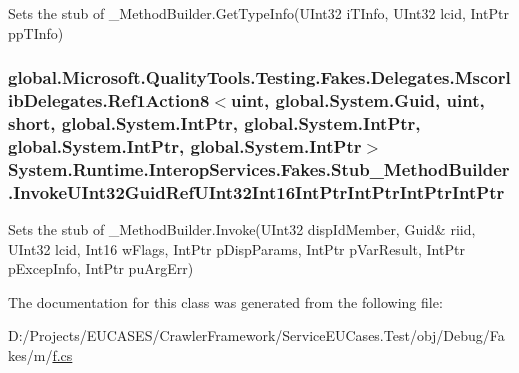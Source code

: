Sets the stub of \-\_\-\-Method\-Builder.\-Get\-Type\-Info(\-U\-Int32 i\-T\-Info, U\-Int32 lcid, Int\-Ptr pp\-T\-Info)

\hypertarget{class_system_1_1_runtime_1_1_interop_services_1_1_fakes_1_1_stub___method_builder_a21fb1bd98049f915375c23202856396f}{
\subsubsection[{Invoke\-U\-Int32\-Guid\-Ref\-U\-Int32\-Int16\-Int\-Ptr\-Int\-Ptr\-Int\-Ptr\-Int\-Ptr}]{\setlength{\rightskip}{0pt plus 5cm}global.\-Microsoft.\-Quality\-Tools.\-Testing.\-Fakes.\-Delegates.\-Mscorlib\-Delegates.\-Ref1\-Action8$<$uint, global.\-System.\-Guid, uint, short, global.\-System.\-Int\-Ptr, global.\-System.\-Int\-Ptr, global.\-System.\-Int\-Ptr, global.\-System.\-Int\-Ptr$>$ System.\-Runtime.\-Interop\-Services.\-Fakes.\-Stub\-\_\-\-Method\-Builder.\-Invoke\-U\-Int32\-Guid\-Ref\-U\-Int32\-Int16\-Int\-Ptr\-Int\-Ptr\-Int\-Ptr\-Int\-Ptr}}\label{class_system_1_1_runtime_1_1_interop_services_1_1_fakes_1_1_stub___method_builder_a21fb1bd98049f915375c23202856396f}


Sets the stub of \-\_\-\-Method\-Builder.\-Invoke(U\-Int32 disp\-Id\-Member, Guid\& riid, U\-Int32 lcid, Int16 w\-Flags, Int\-Ptr p\-Disp\-Params, Int\-Ptr p\-Var\-Result, Int\-Ptr p\-Excep\-Info, Int\-Ptr pu\-Arg\-Err)



The documentation for this class was generated from the following file\-:\begin{DoxyCompactItemize}
\item 
D\-:/\-Projects/\-E\-U\-C\-A\-S\-E\-S/\-Crawler\-Framework/\-Service\-E\-U\-Cases.\-Test/obj/\-Debug/\-Fakes/m/\hyperlink{m_2f_8cs}{f.\-cs}\end{DoxyCompactItemize}
